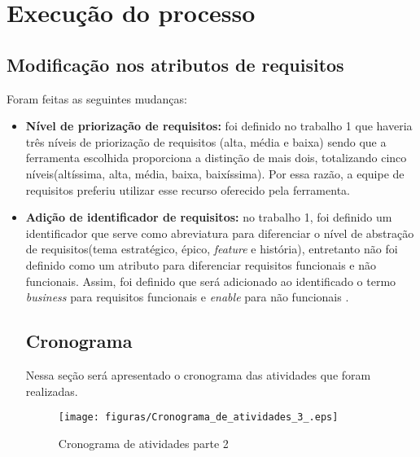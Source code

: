 \chapter[Execução do processo]{Execução do processo}

\section{Modificação nos atributos de requisitos}
Foram feitas as seguintes mudanças:

\begin{itemize}
\item \textbf{Nível de priorização de requisitos:}
foi definido no trabalho 1 que haveria três níveis de priorização de requisitos (alta, média e baixa) sendo que a ferramenta escolhida proporciona a distinção de mais dois, totalizando cinco níveis(altíssima, alta, média, baixa, baixíssima). Por essa razão, a equipe de requisitos preferiu utilizar esse recurso oferecido pela ferramenta.
\item \textbf{Adição de identificador de requisitos:}
no trabalho 1, foi definido um identificador que serve como abreviatura para diferenciar o nível de abstração de requisitos(tema estratégico, épico, \textit{feature} e história), entretanto não foi definido como um atributo para diferenciar requisitos funcionais e não funcionais. Assim, foi definido que será adicionado ao identificado o termo \textit{business} para requisitos funcionais e \textit{enable} para não funcionais \cite{safe}.
\section{Cronograma}
Nessa seção será apresentado o cronograma das atividades que foram realizadas. 
\begin{figure}[H]
    \centering
    \label{cronogramaSegundaParte}
    \texttt{[image: figuras/Cronograma\_de\_atividades\_3\_.eps]}
    \caption[Cronograma 2]{Cronograma de atividades parte 2}
\end{figure}
\end{itemize}

